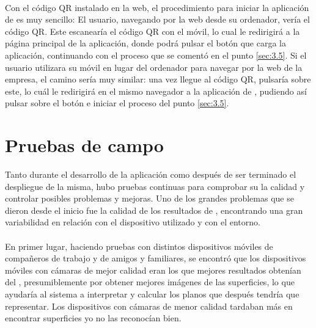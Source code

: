 \documentclass{subfiles}
\begin{document}
    \paragraph{}
    Con el código QR instalado en la web, el procedimiento para iniciar la aplicación de \ra es muy sencillo: El usuario, navegando por la web desde su ordenador, vería el código QR. Este escanearía el código QR con el móvil, lo cual le redirigirá a la página principal de la aplicación, donde podrá pulsar el botón que carga la aplicación, continuando con el proceso que se comentó en el punto \ref{sec:3.5}. Si el usuario utilizara su móvil en lugar del ordenador para navegar por la web de la empresa, el camino sería muy similar: una vez llegue al código QR, pulsaría sobre este, lo cuál le redirigirá en el mismo navegador a la aplicación de \ra, pudiendo así pulsar sobre el botón e iniciar el proceso del punto \ref{sec:3.5}.

    \section{Pruebas de campo}
    \label{sec:5.2}
    Tanto durante el desarrollo de la aplicación como después de ser terminado el despliegue de la misma, hubo pruebas continuas para comprobar su la calidad y controlar posibles problemas y mejoras. Uno de los grandes problemas que se dieron desde el inicio fue la calidad de los resultados de \hittest, encontrando una gran variabilidad en relación con el dispositivo utilizado y con el entorno.

    \paragraph{}
    En primer lugar, haciendo pruebas con distintos dispositivos móviles de compañeros de trabajo y de amigos y familiares, se encontró que los dispositivos móviles con cámaras de mejor calidad eran los que mejores resultados obtenían del \hittest, presumiblemente por obtener mejores imágenes de las superficies, lo que ayudaría al sistema a interpretar y calcular los planos que después tendría que representar. Los dispositivos con cámaras de menor calidad tardaban más en encontrar superficies y\/o no las reconocían bien.
\end{document}
